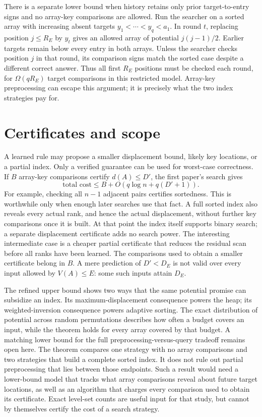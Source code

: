 \documentclass[10pt,letterpaper]{article}
\begin{document}
There is a separate lower bound when history retains only prior
target-to-entry signs and no array-key comparisons are allowed. Run
the searcher on a sorted array with increasing absent targets
$y_1<\cdots<y_q<a_1$. In round $t$, replacing position
$j\le R_E$ by $y_t$ gives an allowed array of potential
$j(j-1)/2$. Earlier targets remain below every entry in both
arrays. Unless the searcher checks position $j$ in that round, its
comparison signs match the sorted case despite a different correct
answer. Thus all first $R_E$ positions must be checked each round,
for $\Omega(qR_E)$ target comparisons in this restricted model.
Array-key preprocessing can escape this argument; it is precisely
what the two index strategies pay for.

\newpage
\section{Certificates and scope}
A learned rule may propose a smaller displacement bound, likely key
locations, or a partial index. Only a verified guarantee can be used
for worst-case correctness. If $B$ array-key comparisons certify
$d(A)\le D'$, the first paper's search gives
\[
 \text{total cost}\le B+O\!\left(q\log n+q(D'+1)\right).
\]
For example, checking all $n-1$ adjacent pairs certifies sortedness.
This is worthwhile only when enough later searches use that fact.
A full sorted index also reveals every actual rank, and hence the
actual displacement, without further key comparisons once it is
built. At that point the index itself supports binary search; a
separate displacement certificate adds no search power. The
interesting intermediate case is a cheaper partial certificate that
reduces the residual scan before all ranks have been learned.
The comparisons used to obtain a smaller certificate belong in $B$.
A mere prediction of $D'<D_E$ is not valid over every input allowed
by $V(A)\le E$: some such inputs attain $D_E$.

The refined upper bound shows two ways that the same potential promise
can subsidize an index. Its maximum-displacement consequence powers
the heap; its weighted-inversion consequence powers adaptive sorting.
The exact distribution of potential across random permutations
describes how often a budget covers an input, while the theorem holds
for every array covered by that budget. A matching lower bound for
the full preprocessing-versus-query tradeoff remains open here.
The theorem compares one strategy with no array comparisons and two
strategies that build a complete sorted index. It does not rule out
partial preprocessing that lies between those endpoints. Such a
result would need a lower-bound model that tracks what array
comparisons reveal about future target locations, as well as an
algorithm that charges every comparison used to obtain its
certificate. Exact level-set counts are useful input for that study,
but cannot by themselves certify the cost of a search strategy.
\end{document}

